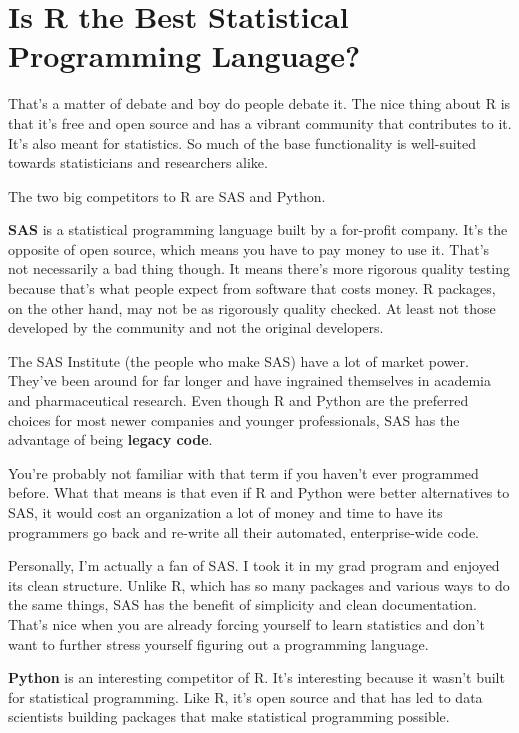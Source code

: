\documentclass[
]{book}
\begin{document}
\hypertarget{is-r-the-best-statistical-programming-language}{%
\section{Is R the Best Statistical Programming Language?}\label{is-r-the-best-statistical-programming-language}}

That's a matter of debate and boy do people debate it. The nice thing about R is that it's free and open source and has a vibrant community that contributes to it. It's also meant for statistics. So much of the base functionality is well-suited towards statisticians and researchers alike.

The two big competitors to R are SAS and Python.

\textbf{SAS} is a statistical programming language built by a for-profit company. It's the opposite of open source, which means you have to pay money to use it. That's not necessarily a bad thing though. It means there's more rigorous quality testing because that's what people expect from software that costs money. R packages, on the other hand, may not be as rigorously quality checked. At least not those developed by the community and not the original developers.

The SAS Institute (the people who make SAS) have a lot of market power. They've been around for far longer and have ingrained themselves in academia and pharmaceutical research. Even though R and Python are the preferred choices for most newer companies and younger professionals, SAS has the advantage of being \textbf{legacy code}.

You're probably not familiar with that term if you haven't ever programmed before. What that means is that even if R and Python were better alternatives to SAS, it would cost an organization a lot of money and time to have its programmers go back and re-write all their automated, enterprise-wide code.

Personally, I'm actually a fan of SAS. I took it in my grad program and enjoyed its clean structure. Unlike R, which has so many packages and various ways to do the same things, SAS has the benefit of simplicity and clean documentation. That's nice when you are already forcing yourself to learn statistics and don't want to further stress yourself figuring out a programming language.

\textbf{Python} is an interesting competitor of R. It's interesting because it wasn't built for statistical programming. Like R, it's open source and that has led to data scientists building packages that make statistical programming possible.
\end{document}
